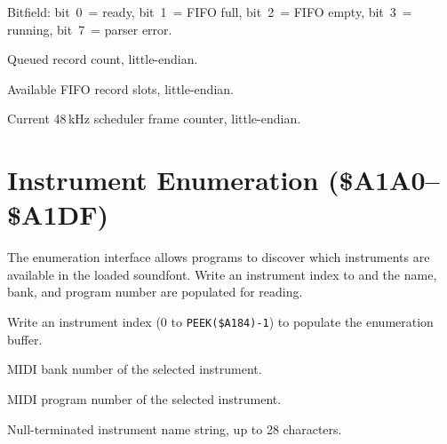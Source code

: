 
Bitfield: bit~0~= ready, bit~1~= FIFO full, bit~2~= FIFO empty,
bit~3~= running, bit~7~= parser error.


Queued record count, little-endian.


Available FIFO record slots, little-endian.


Current 48\,kHz scheduler frame counter, little-endian.


\section{Instrument Enumeration (\$A1A0--\$A1DF)}
\label{sec:wts-enum}

The enumeration interface allows programs to discover which instruments are
available in the loaded soundfont.  Write an instrument index to 
and the name, bank, and program number are populated for reading.



Write an instrument index (0 to \texttt{PEEK(\$A184)-1}) to populate the
enumeration buffer.



MIDI bank number of the selected instrument.



MIDI program number of the selected instrument.



Null-terminated instrument name string, up to 28 characters.

